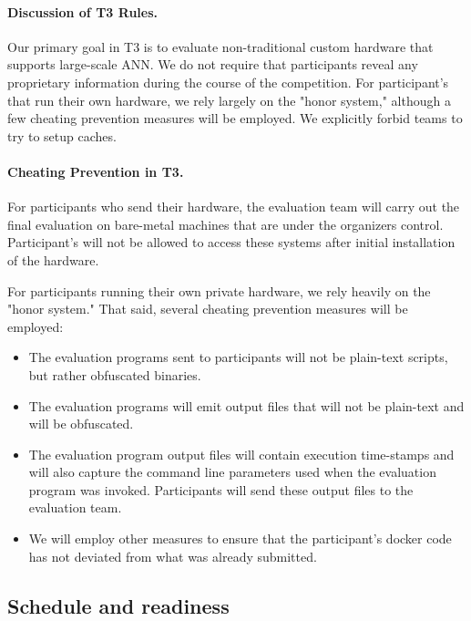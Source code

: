 \paragraph{Discussion of T3 Rules.}
Our primary goal in T3 is to evaluate non-traditional custom hardware that supports large-scale ANN.
We do not require that participants reveal any proprietary information during the course of the competition.  For
participant's that run their own hardware, we rely largely on the "honor system," although a few cheating
prevention measures will be employed. We explicitly forbid teams to try to setup caches. 

\paragraph{Cheating Prevention in T3.} 

For participants who send their hardware, the evaluation team will carry out the final evaluation on 
bare-metal machines that are under the organizers control. Participant's will not be allowed to access 
these systems after initial installation of the hardware.  

For participants running their own private hardware, we rely heavily on the "honor system." 
That said, several cheating prevention measures will be employed:

\begin{itemize}
\item The evaluation programs sent to participants will not be plain-text scripts, but rather obfuscated binaries.
\item The evaluation programs will emit output files that will not be plain-text and will be obfuscated.
\item The evaluation program output files will contain execution time-stamps and will also capture the command line parameters used when 
the evaluation program was invoked.  Participants will send these output files to the evaluation team.
\item We will employ other measures to ensure that the participant's docker code has not deviated from what was already submitted.
\end{itemize}


\subsection{Schedule and readiness}

